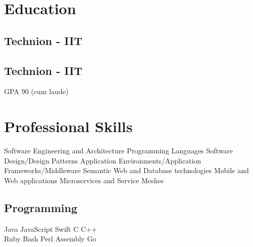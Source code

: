 \documentclass[]{deedy-resume}
\begin{document}
%
%

%
%



%
%

\begin{minipage}[t]{0.33\textwidth}


\section{Education}

\subsection{Technion - IIT}
\sectionsep
\subsection{Technion - IIT}
GPA 90 (cum laude)
\sectionsep


\section{Professional Skills}
Software Engineering and Architecture \textbullet{} Programming Languages \textbullet{} Software Design/Design Patterns \textbullet{} Application Environments/Application Frameworks/Middleware \textbullet{} Semantic Web and Database technologies \textbullet{} Mobile and Web applications \textbullet{} Microservices and Service Meshes
\sectionsep

\subsection{Programming}
Java \textbullet{} JavaScript \textbullet{} Swift \textbullet{} C \textbullet{}  C++ \\
Ruby  \textbullet{}  Bash \textbullet{}  Perl \textbullet{} Assembly \textbullet{} Go
\sectionsep


\end{minipage}
\end{document}
